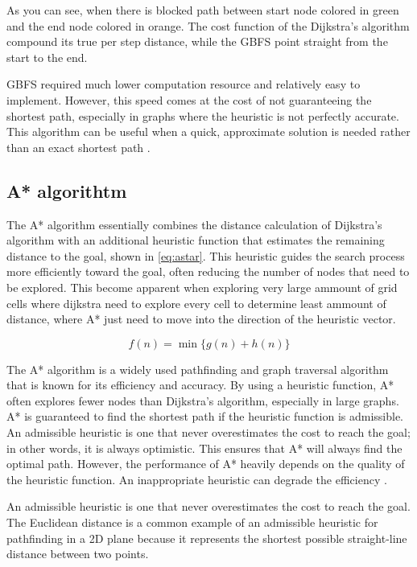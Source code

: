 \documentclass[12pt]{report}
\begin{document}
        As you can see, when there is blocked path between start node colored in green and the end node colored in orange.
        The cost function of the Dijkstra's algorithm compound its true per step distance, while the GBFS point straight
        from the start to the end. 
        
        GBFS required much lower computation resource and relatively easy to implement. However, this speed comes at the
        cost of not guaranteeing the shortest path, especially in graphs where the heuristic is not perfectly accurate.
        This algorithm can be useful when a quick, approximate solution is needed rather than an exact shortest path
        \cite{russell_artificial_2016}.

        \subsection{A* algorithtm}
        The A* algorithm essentially combines the distance calculation of Dijkstra's algorithm with an additional
        heuristic function that estimates the remaining distance to the goal, shown in \ref{eq:astar}. This heuristic
        guides the search process more efficiently toward the goal, often reducing the number of nodes that need to be
        explored. This become apparent when exploring very large ammount of grid cells where dijkstra need to explore
        every cell to determine least ammount of distance, where A* just need to move into the direction of the
        heuristic vector.

        \begin{equation}\label{eq:astar}
            f(n) = \min_{} \{g(n) + h(n)\}
        \end{equation}

        The A* algorithm is a widely used pathfinding and graph traversal algorithm that is known for its efficiency and
        accuracy. By using a heuristic function, A* often explores fewer nodes than Dijkstra's algorithm, especially in
        large graphs. A* is guaranteed to find the shortest path if the heuristic function is admissible. An admissible
        heuristic is one that never overestimates the cost to reach the goal; in other words, it is always optimistic.
        This ensures that A* will always find the optimal path. However, the performance of A* heavily depends on the
        quality of the heuristic function. An inappropriate heuristic can degrade the efficiency \cite{knuth_art_1997}.

        An admissible heuristic is one that never overestimates the cost to reach the goal. The Euclidean distance is a
        common example of an admissible heuristic for pathfinding in a 2D plane because it represents the shortest
        possible straight-line distance between two points.
            
\end{document}
